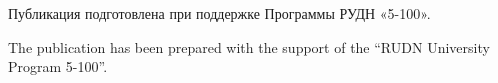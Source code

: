 \begin{Russian}
\def\acknowledgmentsname{Благодарности}
\end{Russian}

\begin{acknowledgments}




\begin{Russian}
Публикация подготовлена при поддержке Программы РУДН «5-100».
%
\end{Russian}
\begin{English}
The publication has been prepared with the support of the ``RUDN University Program 5-100''.


\end{English}
\end{acknowledgments}
